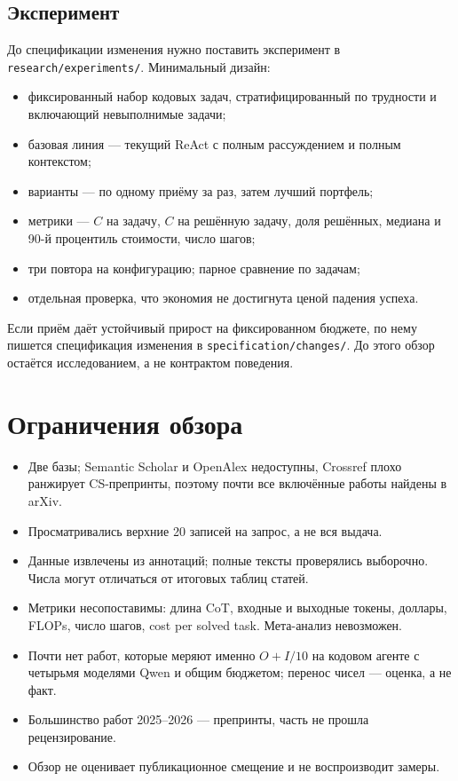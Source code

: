 \documentclass[11pt,a4paper]{article}
\newcommand{\code}[1]{\texttt{#1}}
\begin{document}
\subsection{Эксперимент}

До спецификации изменения нужно поставить эксперимент в
\code{research/experiments/}. Минимальный дизайн:

\begin{itemize}
  \item фиксированный набор кодовых задач, стратифицированный по трудности
        и включающий невыполнимые задачи;
  \item базовая линия — текущий ReAct с полным рассуждением и полным
        контекстом;
  \item варианты — по одному приёму за раз, затем лучший портфель;
  \item метрики — $C$ на задачу, $C$ на решённую задачу, доля решённых,
        медиана и 90-й процентиль стоимости, число шагов;
  \item три повтора на конфигурацию; парное сравнение по задачам;
  \item отдельная проверка, что экономия не достигнута ценой падения
        успеха.
\end{itemize}

Если приём даёт устойчивый прирост на фиксированном бюджете, по нему
пишется спецификация изменения в \code{specification/changes/}. До этого
обзор остаётся исследованием, а не контрактом поведения.

\section{Ограничения обзора}

\begin{itemize}
  \item Две базы; Semantic Scholar и OpenAlex недоступны, Crossref плохо
        ранжирует CS-препринты, поэтому почти все включённые работы найдены
        в arXiv.
  \item Просматривались верхние 20 записей на запрос, а не вся выдача.
  \item Данные извлечены из аннотаций; полные тексты проверялись
        выборочно. Числа могут отличаться от итоговых таблиц статей.
  \item Метрики несопоставимы: длина CoT, входные и выходные токены,
        доллары, FLOPs, число шагов, cost per solved task. Мета-анализ
        невозможен.
  \item Почти нет работ, которые меряют именно $O+I/10$ на кодовом агенте
        с четырьмя моделями Qwen и общим бюджетом; перенос чисел — оценка,
        а не факт.
  \item Большинство работ 2025--2026 — препринты, часть не прошла
        рецензирование.
  \item Обзор не оценивает публикационное смещение и не воспроизводит
        замеры.
\end{itemize}



\end{document}
